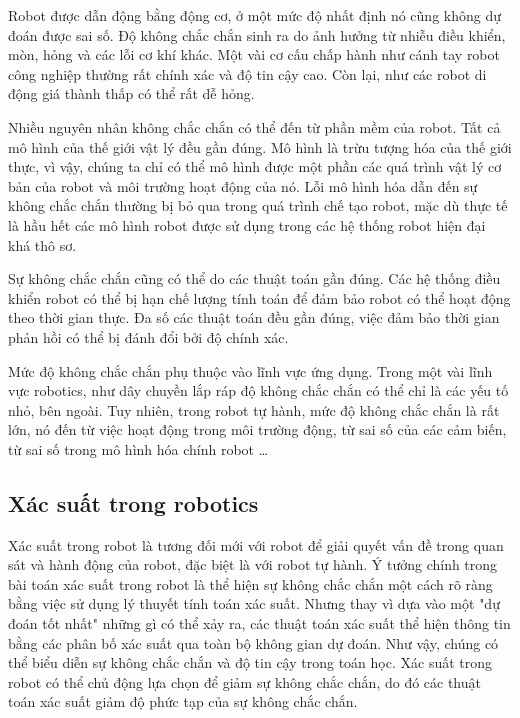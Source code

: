Robot được dẫn động bằng động cơ, ở một mức độ nhất định nó cũng không dự đoán được sai số. Độ không chắc chắn sinh ra do ảnh hưởng từ nhiễu điều khiển, mòn, hỏng và các lỗi cơ khí khác. Một vài cơ cấu chấp hành như cánh tay robot công nghiệp thường rất chính xác và độ tin cậy cao. Còn lại, như các robot di động giá thành thấp có thể rất dễ hỏng.

Nhiều nguyên nhân không chắc chắn có thể đến từ phần mềm của robot. Tất cả mô hình của thế giới vật lý đều gần đúng. Mô hình là trừu tượng hóa của thế giới thực, vì vậy, chúng ta chỉ có thể mô hình được một phần các quá trình vật lý cơ bản của robot và môi trường hoạt động của nó. Lỗi mô hình hóa dẫn đến sự không chắc chắn thường bị bỏ qua trong quá trình chế tạo robot, mặc dù thực tế là hầu hết các mô hình robot được sử dụng trong các hệ thống robot hiện đại khá thô sơ.

Sự không chắc chắn cũng có thể do các thuật toán gần đúng. Các hệ thống điều khiển robot có thể bị hạn chế lượng tính toán để đảm bảo robot có thể hoạt động theo thời gian thực. Đa số các thuật toán đều gần đúng, việc đảm bảo thời gian phản hồi có thể bị đánh đổi bởi độ chính xác.

Mức độ không chắc chắn phụ thuộc vào lĩnh vực ứng dụng. Trong một vài lĩnh vực robotics, như dây chuyền lắp ráp độ không chắc chắn có thể chỉ là các yếu tố nhỏ, bên ngoài. Tuy nhiên, trong robot tự hành, mức độ không chắc chắn là rất lớn, nó đến từ việc hoạt động trong môi trường động, từ sai số của các cảm biến, từ sai số trong mô hình hóa chính robot \dots

\subsection{Xác suất trong robotics} \label{subsec:probabilityinRobotics}

Xác suất trong robot là tương đối mới với robot để giải quyết vấn đề trong quan sát và hành động của robot, đặc biệt là với robot tự hành. Ý tưởng chính trong bài toán xác suất trong robot là thể hiện sự không chắc chắn một cách rõ ràng bằng việc sử dụng lý thuyết tính toán xác suất. Nhưng thay vì dựa vào một "dự đoán tốt nhất" những gì có thể xảy ra, các thuật toán xác suất thể hiện thông tin bằng các phân bố xác suất qua toàn bộ không gian dự đoán. Như vậy, chúng có thể biểu diễn sự không chắc chắn và độ tin cậy trong toán học. Xác suất trong robot có thể chủ động lựa chọn để giảm sự không chắc chắn, do đó các thuật toán xác suất giảm độ phức tạp của sự không chắc chắn.

